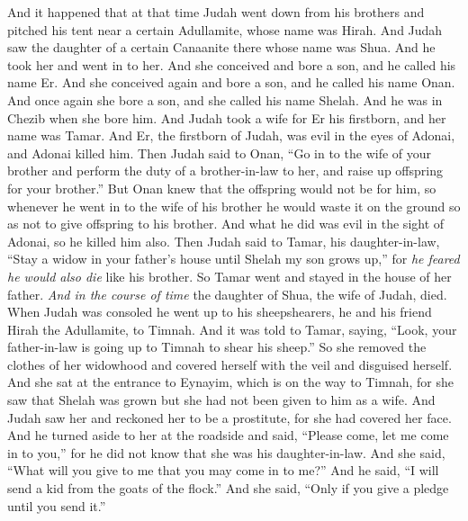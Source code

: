 \begin{biblechapter} %
 And it happened that at that time Judah went down from his brothers and pitched his tent near a certain Adullamite, whose name was Hirah.
\verse And Judah saw the daughter of a certain Canaanite there whose name was Shua. And he took her and went in to her.
\verse And she conceived and bore a son, and he called his name Er.
\verse And she conceived again and bore a son, and he called his name Onan.
\verse And once again she bore a son, and she called his name Shelah. And he was in Chezib when she bore him.
\verse And Judah took a wife for Er his firstborn, and her name was Tamar.
\verse And Er, the firstborn of Judah, was evil in the eyes of Adonai, and Adonai killed him.
\verse Then Judah said to Onan, “Go in to the wife of your brother and perform the duty of a brother-in-law to her, and raise up offspring for your brother.”
\verse But Onan knew that the offspring would not be for him, so whenever he went in to the wife of his brother he would waste it on the ground so as not to give offspring to his brother.
\verse And what he did was evil in the sight of Adonai, so he killed him also.
\verse Then Judah said to Tamar, his daughter-in-law, “Stay a widow in your father’s house until Shelah my son grows up,” for \textit{he feared he would also die} like his brother. So Tamar went and stayed in the house of her father.
\verse \textit{And in the course of time} the daughter of Shua, the wife of Judah, died. When Judah was consoled he went up to his sheepshearers, he and his friend Hirah the Adullamite, to Timnah.
\verse And it was told to Tamar, saying, “Look, your father-in-law is going up to Timnah to shear his sheep.”
\verse So she removed the clothes of her widowhood and covered herself with the veil and disguised herself. And she sat at the entrance to Eynayim, which is on the way to Timnah, for she saw that Shelah was grown but she had not been given to him as a wife.
\verse And Judah saw her and reckoned her to be a prostitute, for she had covered her face.
\verse And he turned aside to her at the roadside and said, “Please come, let me come in to you,” for he did not know that she was his daughter-in-law. And she said, “What will you give to me that you may come in to me?”
\verse And he said, “I will send a kid from the goats of the flock.” And she said, “Only if you give a pledge until you send it.”

\end{biblechapter}

